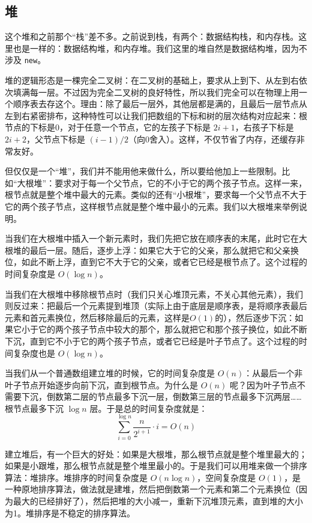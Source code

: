 \subsection{堆}

这个堆和之前那个“栈”差不多。之前说到栈，有两个：数据结构栈，和内存栈。这里也是一样的：数据结构堆，和内存堆。我们这里的堆自然是数据结构堆，因为不涉及 \verb|new|。

堆的逻辑形态是一棵完全二叉树：在二叉树的基础上，要求从上到下、从左到右依次填满每一层。不过因为完全二叉树的良好特性，所以我们完全可以在物理上用一个顺序表去存这个。理由：除了最后一层外，其他层都是满的，且最后一层节点从左到右紧密排布，这种特性可以让我们把数组的下标和树的层次结构对应起来：根节点的下标是0，对于任意一个节点，它的左孩子下标是 $2i+1$，右孩子下标是 $2i+2$，父节点下标是 $(i-1)/2$（向0舍入）。这样，不仅节省了内存，还缓存非常友好。

但仅仅是一个“堆”，我们并不能用他来做什么，所以要给他加上一些限制。比如“大根堆”：要求对于每一个父节点，它的不小于它的两个孩子节点。这样一来，根节点就是整个堆中最大的元素。类似的还有“小根堆”，要求每一个父节点不大于它的两个孩子节点，这样根节点就是整个堆中最小的元素。我们以大根堆来举例说明。

当我们在大根堆中插入一个新元素时，我们先把它放在顺序表的末尾，此时它在大根堆的最后一层。随后，逐步上浮：如果它大于它的父亲，那么就把它和父亲换位，如此不断上浮，直到它不大于它的父亲，或者它已经是根节点了。这个过程的时间复杂度是 $O(\log n)$。

当我们在大根堆中移除根节点时（我们只关心堆顶元素，不关心其他元素），我们则反过来：把最后一个元素提到堆顶（实际上由于底层是顺序表，是将顺序表最后元素和首元素换位，然后移除最后的元素，这样是$O(1)$的），然后逐步下沉：如果它小于它的两个孩子节点中较大的那个，那么就把它和那个孩子换位，如此不断下沉，直到它不小于它的两个孩子节点，或者它已经是叶子节点了。这个过程的时间复杂度也是 $O(\log n)$。

当我们从一个普通数组建立堆的时候，它的时间复杂度是 $O(n)$：从最后一个非叶子节点开始逐步向前下沉，直到根节点。为什么是 $O(n)$ 呢？因为叶子节点不需要下沉，倒数第二层的节点最多下沉一层，倒数第三层的节点最多下沉两层……根节点最多下沉 $\log n$ 层。于是总的时间复杂度就是：
\begin{equation}
\sum_{i=0}^{\log n} \frac{n}{2^{i+1}} \cdot i = O(n)
\end{equation}

建立堆后，有一个巨大的好处：如果是大根堆，那么根节点就是整个堆里最大的；如果是小跟堆，那么根节点就是整个堆里最小的。于是我们可以用堆来做一个排序算法：堆排序。堆排序的时间复杂度是 $O(n \log n)$，空间复杂度是 $O(1)$，是一种原地排序算法，做法就是建堆，然后把倒数第一个元素和第二个元素换位（因为最大的已经排好了），然后把堆的大小减一，重新下沉堆顶元素，直到堆的大小为1。堆排序是不稳定的排序算法。

